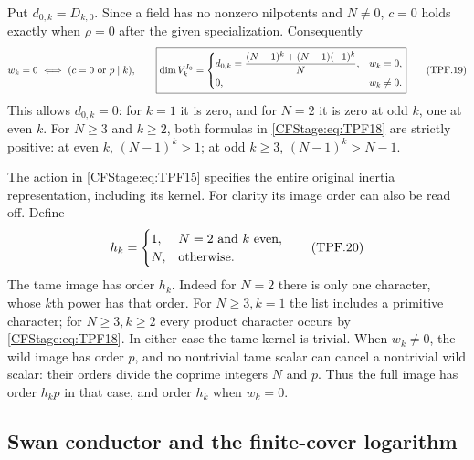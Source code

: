 Put \(d_{0,k}=D_{k,0}\). Since a field has no nonzero
nilpotents and \(N\ne0\), \(c=0\) holds exactly when
\(\rho=0\) after the given specialization. Consequently
\[
 w_k=0\ \Longleftrightarrow\ (c=0\ \hbox{or}\ p\mid k),
 \qquad
 \boxed{\displaystyle
 \dim V_k^{I_0}=
 \begin{cases}
 d_{0,k}=\dfrac{(N-1)^k+(N-1)(-1)^k}{N},&w_k=0,\\[5pt]
 0,&w_k\ne0 .
 \end{cases}}
 \tag{TPF.19}\label{CFStage:eq:TPF19}
\]
This allows \(d_{0,k}=0\): for \(k=1\) it is zero,
and for \(N=2\) it is zero at odd \(k\), one at even
\(k\). For \(N\ge3\) and \(k\ge2\), both formulas
in \eqref{CFStage:eq:TPF18} are strictly positive: at even
\(k\), \((N-1)^k>1\); at odd \(k\ge3\),
\((N-1)^k>N-1\).

The action in \eqref{CFStage:eq:TPF15} specifies the entire
original inertia representation, including its kernel.
For clarity its image order can also be read off.
Define
\[
 h_k=\begin{cases}1,&N=2\ \hbox{and }k\ \hbox{even},\\
                  N,&\hbox{otherwise}.
       \end{cases}
 \tag{TPF.20}\label{CFStage:eq:TPF20}
\]
The tame image has order \(h_k\). Indeed for \(N=2\)
there is only one character, whose \(k\)th power has
that order. For \(N\ge3,k=1\) the list includes a
primitive character; for \(N\ge3,k\ge2\) every product
character occurs by \eqref{CFStage:eq:TPF18}. In either case
the tame kernel is trivial. When \(w_k\ne0\), the wild
image has order \(p\), and no nontrivial tame scalar
can cancel a nontrivial wild scalar: their orders
divide the coprime integers \(N\) and \(p\).
Thus the full image has order \(h_kp\) in that case,
and order \(h_k\) when \(w_k=0\).

\subsection{Swan conductor and the finite-cover logarithm}

